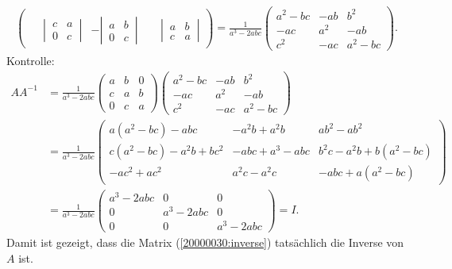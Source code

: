 \begin{loesung}
\begin{align}
\begin{pmatrix}
			\\[13pt]
\phantom{-}\left|\,\begin{matrix}c&a\\0&c\end{matrix}\,\right|
	&-\left|\,\begin{matrix}a&b\\0&c\end{matrix}\,\right|
		&\phantom{-}\left|\,\begin{matrix}a&b\\c&a\end{matrix}\,\right|
\end{pmatrix}
=
\frac1{a^3-2abc}\begin{pmatrix}
a^2-bc&-ab&b^2\\
-ac&a^2&-ab\\
c^2&-ac&a^2-bc
\end{pmatrix}.
\label{20000030:inverse}
\end{align}
Kontrolle:
\begin{align*}
AA^{-1}
&=
\frac1{a^3-2abc}
\begin{pmatrix}
a&b&0\\
c&a&b\\
0&c&a
\end{pmatrix}
\begin{pmatrix}
a^2-bc&-ab&b^2\\
-ac&a^2&-ab\\
c^2&-ac&a^2-bc
\end{pmatrix}
\\
&=
\frac1{a^3-2abc}
\begin{pmatrix}
a(a^2-bc)-abc      &-a^2b+a^2b  &ab^2-ab^2          \\
c(a^2-bc)-a^2b+bc^2&-abc+a^3-abc&b^2c-a^2b+b(a^2-bc)\\
-ac^2+ac^2         &a^2c-a^2c   &-abc+a(a^2-bc)
\end{pmatrix}
\\
&=
\frac1{a^3-2abc}
\begin{pmatrix}
a^3-2abc&0&0\\
0&a^3-2abc&0\\
0&0&a^3-2abc
\end{pmatrix}
=I.
\end{align*}
Damit ist gezeigt, dass die Matrix (\ref{20000030:inverse}) tatsächlich
die Inverse von $A$ ist.
\end{loesung}

